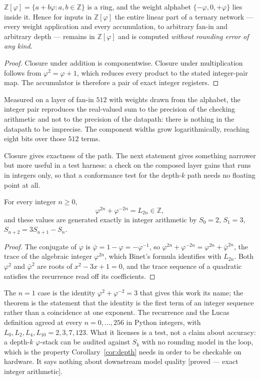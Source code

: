 \begin{theorem}
\label{thm:exact}
$\mathbb{Z}[\varphi] = \{a + b\varphi : a,b \in \mathbb{Z}\}$ is a ring, and the
weight alphabet $\{-\varphi,0,+\varphi\}$ lies inside it. Hence for inputs in
$\mathbb{Z}[\varphi]$ the entire linear part of a ternary network --- every
weight application and every accumulation, to arbitrary fan-in and arbitrary
depth --- remains in $\mathbb{Z}[\varphi]$ and is computed \emph{without
rounding error of any kind}.
\end{theorem}
\begin{proof}
Closure under addition is componentwise. Closure under multiplication follows
from $\varphi^2 = \varphi + 1$, which reduces every product to the stated
integer-pair map. The accumulator is therefore a pair of exact integer registers.
\end{proof}

Measured on a layer of fan-in $512$ with weights drawn from the alphabet, the
integer pair reproduces the real-valued sum to the precision of the checking
arithmetic and not to the precision of the datapath: there is nothing in the
datapath to be imprecise. The component widths grow logarithmically, reaching
eight bits over those $512$ terms.

Closure gives exactness of the path. The next statement gives something narrower
but more useful in a test harness: a check on the composed layer gains that runs
in integers only, so that a conformance test for the depth-$k$ path needs no
floating point at all.

\begin{theorem}
\label{thm:lucas-trace}
For every integer $n\geq0$,
\[
 \varphi^{2n}+\varphi^{-2n}=L_{2n}\in\mathbb{Z},
\]
and these values are generated exactly in integer arithmetic by $S_0=2$,
$S_1=3$, $S_{n+2}=3S_{n+1}-S_n$.
\end{theorem}
\begin{proof}
The conjugate of $\varphi$ is $\bar\varphi=1-\varphi=-\varphi^{-1}$, so
$\varphi^{2n}+\varphi^{-2n}=\varphi^{2n}+\bar\varphi^{2n}$, the trace of the
algebraic integer $\varphi^{2n}$, which Binet's formula identifies with $L_{2n}$.
Both $\varphi^{2}$ and $\bar\varphi^{2}$ are roots of $x^{2}-3x+1=0$, and the
trace sequence of a quadratic satisfies the recurrence read off its coefficients.
\end{proof}

The $n=1$ case is the identity $\varphi^{2}+\varphi^{-2}=3$ that gives this work
its name; the theorem is the statement that the identity is the first term of an
integer sequence rather than a coincidence at one exponent. The recurrence and the
Lucas definition agreed at every $n=0,\dots,256$ in Python integers, with
$L_0,L_2,L_4,L_{10}=2,3,7,123$. What it licenses is a test, not a claim about
accuracy: a depth-$k$ $\varphi$-stack can be audited against
$S_k$ with no rounding model in the loop, which is the property
Corollary~\ref{cor:depth} needs in order to be checkable on hardware. It says
nothing about downstream model quality [proved --- exact integer arithmetic].

